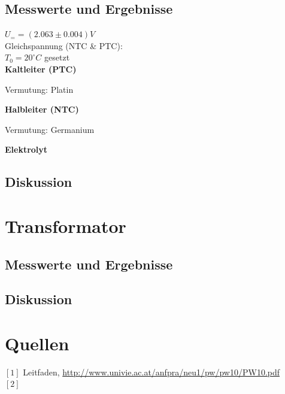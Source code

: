 \documentclass[12pt,a4paper]{article}
\begin{document}
\begin{multicols}{2}
\begin{itemize}
\end{itemize}


\subsection{Messwerte und Ergebnisse}
$U_{=} = (2.063 \pm 0.004)V$\\
\indent Gleichspannung (NTC \& PTC):\\
$T_0 = 20^\circ C$ gesetzt\\






\noindent \textbf{Kaltleiter (PTC)}


Vermutung: Platin

\noindent \textbf{Halbleiter (NTC)}

Vermutung: Germanium

\noindent \textbf{Elektrolyt}



\subsection{Diskussion}





\section{Transformator}



\subsection{Messwerte und Ergebnisse}



\subsection{Diskussion}







\section{Quellen}
$[1]$ Leitfaden, \url{http://www.univie.ac.at/anfpra/neu1/pw/pw10/PW10.pdf}\\
$[2]$ 
\end{multicols}
\end{document}
